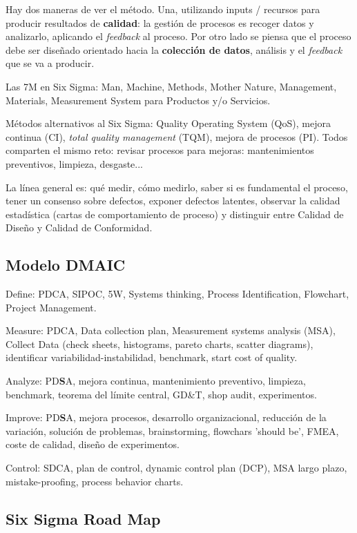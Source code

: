 \documentclass[]{article}
\begin{document}
Hay dos maneras de ver el método. Una, utilizando inputs / recursos para producir resultados de \textbf{calidad}: la gestión de procesos es recoger datos y analizarlo, aplicando el \textit{feedback} al proceso. Por otro lado se piensa que el proceso debe ser diseñado orientado hacia la \textbf{colección de datos}, análisis y el \textit{feedback} que se va a producir.

Las 7M en Six Sigma: Man, Machine, Methods, Mother Nature, Management, Materials, Measurement System para Productos y/o Servicios.

Métodos alternativos al Six Sigma: Quality Operating System (QoS), mejora continua (CI), \textit{total quality management} (TQM), mejora de procesos (PI). Todos comparten el mismo reto: revisar procesos para mejoras: mantenimientos preventivos, limpieza, desgaste...

La línea general es: qué medir, cómo medirlo, saber si es fundamental el proceso, tener un consenso sobre defectos, exponer defectos latentes, observar la calidad estadística (cartas de comportamiento de proceso) y distinguir entre Calidad de Diseño y Calidad de Conformidad. 

\subsection{Modelo DMAIC}
Define: PDCA, SIPOC, 5W, Systems thinking, Process Identification, Flowchart, Project Management.

Measure: PDCA, Data collection plan, Measurement systems analysis (MSA), Collect Data (check sheets, histograms, pareto charts, scatter diagrams), identificar variabilidad-instabilidad, benchmark, start cost of quality. 

Analyze: PD\textbf{S}A, mejora continua, mantenimiento preventivo, limpieza, benchmark, teorema del límite central, GD\&T, shop audit, experimentos. 

Improve: PD\textbf{S}A, mejora procesos, desarrollo organizacional, reducción de la variación, solución de problemas, brainstorming, flowchars 'should be', FMEA, coste de calidad, diseño de experimentos. 

Control: SDCA, plan de control, dynamic control plan (DCP), MSA largo plazo, mistake-proofing, process behavior charts.

\subsection{Six Sigma Road Map}
\end{document}
